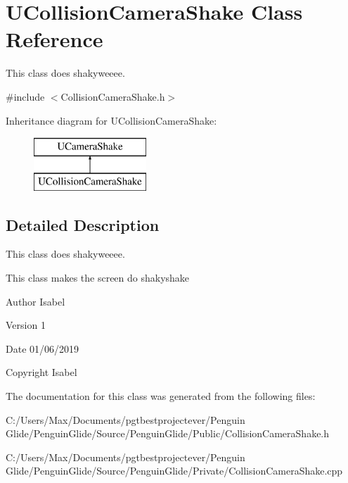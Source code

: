\hypertarget{class_u_collision_camera_shake}{}\section{U\+Collision\+Camera\+Shake Class Reference}
\label{class_u_collision_camera_shake}


This class does shakyweeee.  




{\ttfamily \#include $<$Collision\+Camera\+Shake.\+h$>$}

Inheritance diagram for U\+Collision\+Camera\+Shake\+:\begin{figure}[H]
\begin{center}
\leavevmode
\includegraphics[height=2.000000cm]{class_u_collision_camera_shake}
\end{center}
\end{figure}


\subsection{Detailed Description}
This class does shakyweeee. 

This class makes the screen do shakyshake \begin{DoxyAuthor}{Author}
Isabel 
\end{DoxyAuthor}
\begin{DoxyVersion}{Version}
1 
\end{DoxyVersion}
\begin{DoxyDate}{Date}
01/06/2019 
\end{DoxyDate}
\begin{DoxyCopyright}{Copyright}
Isabel 
\end{DoxyCopyright}


The documentation for this class was generated from the following files\+:\begin{DoxyCompactItemize}
\item 
C\+:/\+Users/\+Max/\+Documents/pgtbestprojectever/\+Penguin Glide/\+Penguin\+Glide/\+Source/\+Penguin\+Glide/\+Public/Collision\+Camera\+Shake.\+h\item 
C\+:/\+Users/\+Max/\+Documents/pgtbestprojectever/\+Penguin Glide/\+Penguin\+Glide/\+Source/\+Penguin\+Glide/\+Private/Collision\+Camera\+Shake.\+cpp\end{DoxyCompactItemize}
